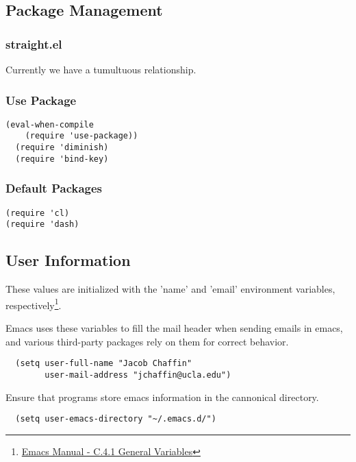 \documentclass[11pt]{article}
\begin{document}
\subsection*{Package Management}
\label{sec:org3539dc1}
\subsubsection*{straight.el}
\label{sec:orgf45399d}

Currently we have a tumultuous relationship.

\subsubsection*{Use Package}
\label{sec:org920788b}

\begin{verbatim}
(eval-when-compile
    (require 'use-package))
  (require 'diminish)
  (require 'bind-key)
\end{verbatim}

\subsubsection*{Default Packages}
\label{sec:org4f345bb}

\begin{verbatim}
(require 'cl)
(require 'dash)
\end{verbatim}

\subsection*{User Information}
\label{sec:org4df887d}

These values are initialized with the ’name’ and ’email’
environment variables, respectively\footnote{\href{https://www.gnu.org/software/emacs/manual/html\_node/emacs/General-Variables.html\#General-Variables}{Emacs Manual - C.4.1 General Variables}}.

Emacs uses these variables to fill the mail header when sending
emails in emacs, and various third-party packages rely on them
for correct behavior.

\begin{verbatim}
  (setq user-full-name "Jacob Chaffin"
        user-mail-address "jchaffin@ucla.edu")
\end{verbatim}

Ensure that programs store emacs information in the cannonical
directory.

\begin{verbatim}
  (setq user-emacs-directory "~/.emacs.d/")
\end{verbatim}
\end{document}
